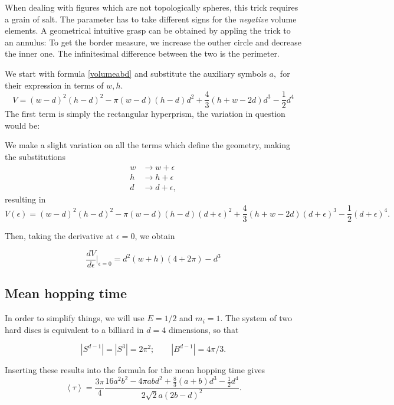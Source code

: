 \documentclass[letterpaper,10pt]{article}
\newcommand{\mean}[1]{\left \langle #1 \right \rangle}
\begin{document}
When dealing with figures
which are not topologically spheres, this trick requires
a grain of salt. The parameter has to take different
signs for the \emph{negative} volume elements. A geometrical
intuitive grasp can be obtained by appling the trick to an annulus:
To get the border measure, we increase the outher circle and
decrease the inner one. The infinitesimal difference between the two
is the perimeter. 


 We start with formula \ref{volumeabd}
and substitute the auxiliary symbols $a,$ for their expression in
terms of $w,h$.
\begin{equation}\label{volumehwd}
 V= (w-d)^2(h-d)^2-\pi(w-d)(h-d)d^2+\frac{4}{3}(h+w-2d)d^3-\frac{1}{2}d^4
\end{equation}
The first term is simply the rectangular hyperprism, the variation in question
would be:

We make a slight variation on all the terms which  define the geometry,
making the substitutions
\begin{align}
w & \rightarrow w+\epsilon \\
h & \rightarrow h+\epsilon \\
d & \rightarrow d+\epsilon ,
\end{align}
resulting in
\begin{equation}\label{volumeepsilon}
 V(\epsilon) = (w-d)^2(h-d)^2-\pi(w-d)(h-d)(d+\epsilon)^2+
\frac{4}{3}(h+w-2d)(d+\epsilon)^3-\frac{1}{2}(d+\epsilon)^4.
\end{equation}

Then, taking the derivative at $\epsilon=0$, we obtain

\begin{equation}\label{Areaepsilon}
 \frac{dV}{d\epsilon} \vert_{\epsilon=0}
= d^2(w+h)(4+2\pi)-d^3
\end{equation}


\subsection{Mean hopping time}

In order to simplify things, we will use $E=1/2$ and $m_i=1$.
The system of two hard discs is equivalent to a billiard in $d=4$ dimensions, so that

\begin{equation}
 |S^{d-1}| = |S^3| = 2 \pi^2; \qquad |B^{d-1}| = 4 \pi / 3.
\end{equation}

Inserting these results into the formula for the mean hopping time gives
\begin{equation}
 \mean{\tau} = 	
\frac{3 \pi}{4}
\frac
{16 a^{2} b^{2}  - 4 \pi a b d^{2} + \textstyle \frac{8}{3} (a+b) d^{3}  - \frac{1}{2} d^{4}}
{ 2 \sqrt{2} a ( 2b - d )^2}.
\end{equation}
\end{document}
